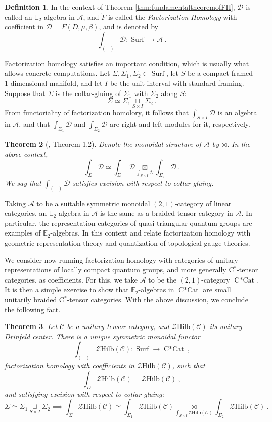 \documentclass[a4paper,11pt,reqno]{amsart}
\numberwithin{equation}{section}
\newtheorem{theorem}{Theorem}[section]
\theoremstyle{remark}
\theoremstyle{definition}
\newtheorem{definition}[theorem]{Definition}
\newcommand{\bE}{\mathbb E}
\newcommand{\cA}{\mathcal A}
\newcommand{\cC}{\mathcal C}
\newcommand{\cD}{\mathcal D}
\newcommand{\cZ}{\mathcal Z}
\DeclareMathOperator{\Surf}{Surf}
\DeclareMathOperator{\CCat}{C*Cat}
\newcommand{\Hilb}{\mathrm{Hilb}}
\begin{document}
\begin{definition}
	In the context of Theorem \ref{thm:fundamentaltheoremofFH}, $\cD$ is called an $\bE_2$-algebra in $\cA$, and $\tilde{F}$ is called the {\em Factorization Homology} with coefficient in $\cD = F(D,\mu,\beta)$, and is denoted by
	\[
	\int_{(-)} \cD : \Surf \to \cA  \ .
	\]
	\label{def:FH}
\end{definition}

Factorization homology satisfies an important condition, which is usually what allows concrete computations. Let $\Sigma,\Sigma_1,\Sigma_2 \in \Surf$, let $S$ be a compact framed 1-dimensional manifold, and let $I$ be the unit interval with standard framing. Suppose that $\Sigma$ is the collar-gluing of $\Sigma_1$ with $\Sigma_2$ along $S$:
\[
\Sigma \simeq \Sigma_1 \underset{S \times I} {\sqcup} \Sigma_2 \ .
\]
From functoriality of factorization homolory, it follows that $\int_{S \times I} \cD$ is an algebra in $\cA$, and that $\int_{\Sigma_1} \cD$ and $\int_{\Sigma_2} \cD$ are right and left modules for it, respectively. 

\begin{theorem}[\cite{MR3431668}, Theorem 1.2]
	Denote the monoidal structure of $\cA$ by $\boxtimes$. In the above context,
	\[
	\int_\Sigma \cD \simeq \int_{\Sigma_1} \cD \underset{\int_{S \times I} \cD}{\boxtimes} \int_{\Sigma_2} \cD \ .
	\]
	We say that $\int_{(-)} \cD$ satisfies excision with respect to collar-gluing.
\end{theorem}

Taking $\cA$ to be a suitable symmetric monoidal $(2,1)$-category of linear categories, an $\bE_2$-algebra in $\cA$ is the same as a braided tensor category in $\cA$. In particular, the representation categories of quasi-triangular quantum groups are examples of $\bE_2$-algebras. In this context \cite{MR3847209} and \cite{MR3874702} relate factorization homology with geometric representation theory and quantization of topological gauge theories. 

We consider now running factorization homology with categories of unitary representations of locally compact quantum groups, and more generally C$^*$-tensor categories, as coefficients. For this, we take $\cA$ to be the $(2,1)$-category $\CCat$. It is then a simple exercise to show that $\bE_2$-algebras in $\CCat$ are small unitarily braided C$^*$-tensor categories.  With the above discussion, we conclude the following fact.

\begin{theorem}
	Let $\cC$ be a unitary tensor category, and $\cZ \Hilb(\cC)$ its unitary Drinfeld center. There is a unique symmetric monoidal functor
	\[
	\int_{(-)} \cZ \Hilb(\cC): \Surf \to \CCat \ , 
	\]
	factorization homology with coefficients in $\cZ \Hilb(\cC)$, such that
	\[ \int_D \cZ \Hilb(\cC) = \cZ \Hilb(\cC) \ , \]
	and satisfying excision with respect to collar-gluing:
	\[
	\Sigma \simeq \Sigma_1 \underset{S \times I} {\sqcup} \Sigma_2 \implies \int_{\Sigma} \cZ\Hilb(\cC) \simeq \int_{\Sigma_1} \cZ\Hilb(\cC) \underset{\int_{S \times I}\cZ \Hilb(\cC)} {\boxtimes} \int_{\Sigma_2} \cZ\Hilb(\cC) \ . 
	\]
		
\end{theorem}
\bigskip
\end{document}
